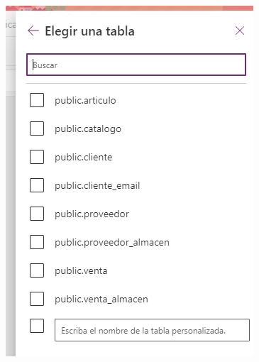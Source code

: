 \documentclass[letter,12pt]{article} %
\begin{document}
\begin{enumerate}
\begin{center}
\includegraphics[scale=0.70]{imagenes/P15.jpg}
\end{center}
\end{enumerate}
\end{document}
